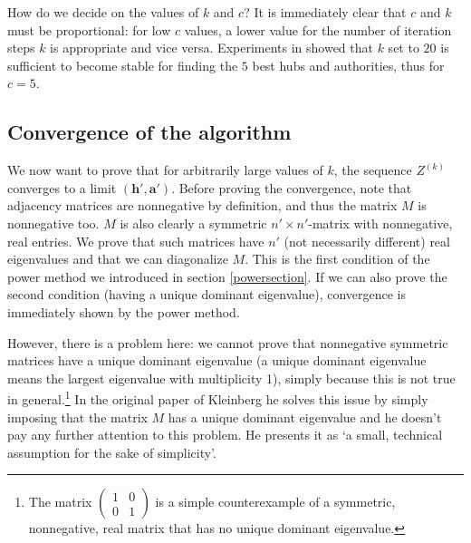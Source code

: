 \documentclass[a4paper,11pt]{report}
\begin{document}
How do we decide on the values of $k$ and $c$? It is immediately clear that $c$ and $k$ must
be proportional: for low $c$ values, a lower 
value for the number of iteration steps $k$ is appropriate and vice versa. 
Experiments in \cite{kleinberg} showed that $k$ set to $20$ is sufficient to 
become stable for finding the $5$ best hubs and authorities, thus for $c = 5$. 

\subsection{Convergence of the algorithm}
We now want to prove that for arbitrarily large values of $k$, the
sequence $Z^{(k)}$ converges to a limit $(\mathbf{h'}, \mathbf{a'})$. Before 
  proving the convergence, note that  adjacency matrices are nonnegative by definition, and thus the matrix $M$ is 
nonnegative too. $M$ is also clearly a symmetric $n' \times n'$-matrix with nonnegative, real entries. We prove that such matrices
have  $n'$ (not necessarily different) real eigenvalues and that we can diagonalize $M$.   This is the first condition of the  
power method we introduced in section \ref{powersection}.
If we can also prove the second condition (having a unique dominant eigenvalue), 
convergence is immediately shown by the power method.

However, there is a problem here: we cannot prove that nonnegative symmetric matrices have a unique dominant 
eigenvalue (a unique dominant eigenvalue means the largest eigenvalue with multiplicity 1), simply because this is not true in general.\footnote{The matrix $\begin{pmatrix} 
1 & 0\\
0 & 1
\end{pmatrix}$ is a simple counterexample of a symmetric, nonnegative, real matrix that has no unique dominant eigenvalue.} 
In the original paper of Kleinberg \cite{kleinberg} he solves this issue by 
simply imposing that the matrix $M$ has a unique dominant eigenvalue and he doesn't pay any further attention to this problem.  
He presents it as `a small, technical assumption for the sake of simplicity'.
\end{document}
